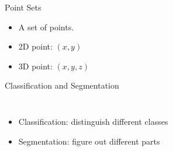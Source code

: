 \documentclass[serif,mathserif]{beamer}
\begin{document}
\begin{frame}{Point Sets}
	\begin{itemize}
		\item A set of points.
		\item 2D point: $ (x,y) $
		\item 3D point: $ (x,y,z) $
	\end{itemize}
	\begin{figure}[t]
		\centering
	\end{figure}
\end{frame}

\begin{frame}{Classification and Segmentation}
	\begin{columns}
	\begin{itemize}
		\item Classification: distinguish different classes
		\item Segmentation: figure out different parts
	\end{itemize}
	\begin{figure}
		\centering
		
	\end{figure}
	\end{columns}
	
\end{frame}
\end{document}
